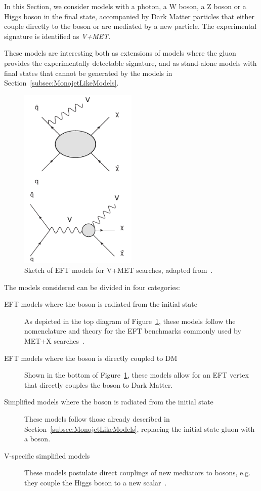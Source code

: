
In this Section, we consider models with a photon, a W boson, a Z boson or a Higgs boson in the final state, 
accompanied by Dark Matter particles that either couple directly to the boson or are mediated by 
a new particle. The experimental signature is identified as \textit{V+MET}. 

These models are interesting both as extensions of models where the gluon provides 
the experimentally detectable signature, 
and as stand-alone models with final states that cannot be generated by the models in
Section~\ref{subsec:MonojetLikeModels}.


\begin{figure}[h!]
  \centering
    \includegraphics[width=0.5\textwidth]{figures/VPlusMET_EFT}
  \caption{Sketch of EFT models for V+MET searches, adapted from~\citep{Nelson:2013pqa}. \label{fig:VPlusMET_EFT}}
\end{figure}
% 
The models considered can be divided in four categories:
\begin{description}
 \item[EFT models where the boson is radiated from the initial state] As depicted in 
 the top diagram of Figure~\ref{fig:VPlusMET_EFT}, these  models follow the nomenclature and theory 
 for the EFT benchmarks commonly used by MET+X searches~\citep{Goodman:2010ku}. 
 \item[EFT models where the boson is directly coupled to DM] Shown in the bottom of Figure~\ref{fig:VPlusMET_EFT},
 these models allow for an EFT vertex that directly couples the boson to Dark Matter. 
 \item[Simplified models where the boson is radiated from the initial state] These models follow those
 already described in Section~\ref{subsec:MonojetLikeModels}, replacing the initial state gluon with a boson.
 \item[V-specific simplified models] These models postulate direct couplings of new mediators
 to bosons, e.g. they couple the Higgs boson to a new scalar~\citep{Carpenter:2013xra}. 
\end{description}

